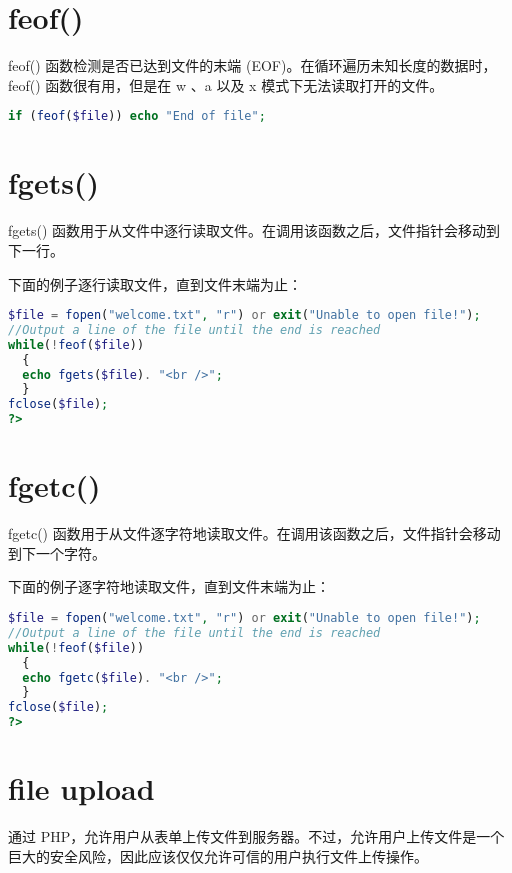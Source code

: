 \section{feof()}


feof() 函数检测是否已达到文件的末端 (EOF)。在循环遍历未知长度的数据时，feof() 函数很有用，但是在 w 、a 以及 x 模式下无法读取打开的文件。


\begin{lstlisting}[language=PHP]
if (feof($file)) echo "End of file";
\end{lstlisting}



\section{fgets()}


fgets() 函数用于从文件中逐行读取文件。在调用该函数之后，文件指针会移动到下一行。

下面的例子逐行读取文件，直到文件末端为止：


\begin{lstlisting}[language=PHP]
$file = fopen("welcome.txt", "r") or exit("Unable to open file!");
//Output a line of the file until the end is reached
while(!feof($file))
  {
  echo fgets($file). "<br />";
  }
fclose($file);
?>
\end{lstlisting}


\section{fgetc()}


fgetc() 函数用于从文件逐字符地读取文件。在调用该函数之后，文件指针会移动到下一个字符。

下面的例子逐字符地读取文件，直到文件末端为止：

\begin{lstlisting}[language=PHP]
$file = fopen("welcome.txt", "r") or exit("Unable to open file!");
//Output a line of the file until the end is reached
while(!feof($file))
  {
  echo fgetc($file). "<br />";
  }
fclose($file);
?>
\end{lstlisting}


\section{f\/ile upload}

通过 PHP，允许用户从表单上传文件到服务器。不过，允许用户上传文件是一个巨大的安全风险，因此应该仅仅允许可信的用户执行文件上传操作。

